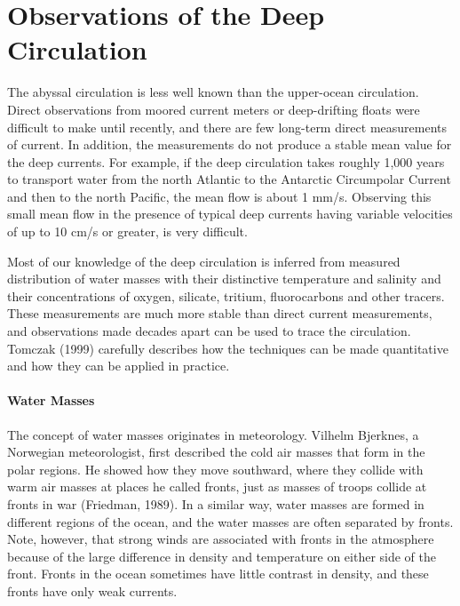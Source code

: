 \section{Observations of the Deep Circulation}
The abyssal circulation is less well known than the
upper-ocean circulation. Direct observations from moored current meters or deep-drifting
floats were difficult to make until recently, and there are few long-term direct measurements
of current. In addition, the measurements do not produce a stable mean value for the deep
currents. For example, if the deep circulation takes roughly 1,000 years to transport water from the north Atlantic to the Antarctic Circumpolar Current and then to the north Pacific, the mean flow is about 1 mm/s. Observing this small mean flow in the presence of typical deep currents having variable velocities of up to 10 cm/s or greater, is very difficult.

Most of our knowledge of the deep circulation is inferred from measured distribution of water masses with their distinctive temperature and salinity and their concentrations of oxygen, silicate, tritium, fluorocarbons and other tracers. These measurements are much more stable than direct current measurements, and observations made decades apart can be used to trace the circulation. Tomczak (1999) carefully describes how the techniques can be made quantitative and how they can be applied in practice.

\paragraph{Water Masses}
The concept of water masses originates in meteorology. Vilhelm Bjerknes, a
Norwegian meteorologist, first described the cold air masses that form in the
polar regions. He showed how they move southward, where they collide with
warm air masses at places he called fronts, just as masses of troops collide at
fronts in war (Friedman, 1989). In a similar way, water masses are formed in
different regions of the ocean, and the water masses are often separated by
fronts. Note, however, that strong winds are associated with fronts in the
atmosphere because of the large difference in density and temperature on either
side of the front. Fronts in the ocean sometimes have little contrast in
density, and these fronts have only weak currents.

